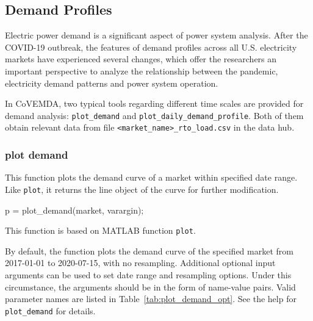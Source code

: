 \documentclass[11pt]{article}
\newcommand{\covemda}{CoVEMDA}
\newcommand{\matlab}{\textsc{MATLAB}}
\numberwithin{equation}{section}
\numberwithin{table}{section}
\numberwithin{figure}{section}
\begin{document}
\subsection{Demand Profiles}

Electric power demand is a significant aspect of power system analysis. After the COVID-19 outbreak, the features of demand profiles across all U.S. electricity markets have experienced several changes, which offer the researchers an important perspective to analyze the relationship between the pandemic, electricity demand patterns and power system operation.

In \covemda{}, two typical tools regarding different time scales are provided for demand analysis: \verb!plot_demand! and \verb!plot_daily_demand_profile!. Both of them obtain relevant data from file \verb!<market_name>_rto_load.csv! in the data hub.

\subsubsection{plot demand}

This function plots the demand curve of a market within specified date range. Like \verb!plot!, it returns the line object of the curve for further modification.

\begin{Code}
  p = plot_demand(market, varargin);
\end{Code}

This function is based on \matlab{} function \verb!plot!.

By default, the function plots the demand curve of the specified market from 2017-01-01 to 2020-07-15, with no resampling. Additional optional input arguments can be used to set date range and resampling options. Under this circumstance, the arguments should be in the form of name-value pairs. Valid parameter names are listed in Table~\ref{tab:plot_demand_opt}. See the help for \verb!plot_demand! for details.
\end{document}
